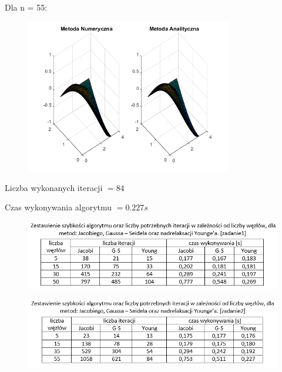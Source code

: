 Dla n = 55:

\begin{figure}[!ht]
	\begin{center}
		\includegraphics[width=0.8\textwidth]{Lab6/charts/young/zad2/55.png}
	\end{center}
\end{figure}

Liczba wykonanych iteracji $ = 84 $

Czas wykonywania algorytmu $ = 0.227 s$

\begin{figure}[!ht]
	\begin{center}
		\includegraphics[width=1\textwidth]{Lab6/charts/zestawienie_zad1.png}
	\end{center}
\end{figure}

\begin{figure}[!ht]
	\begin{center}
		\includegraphics[width=1\textwidth]{Lab6/charts/zestawienie_zad2.png}
	\end{center}
\end{figure}